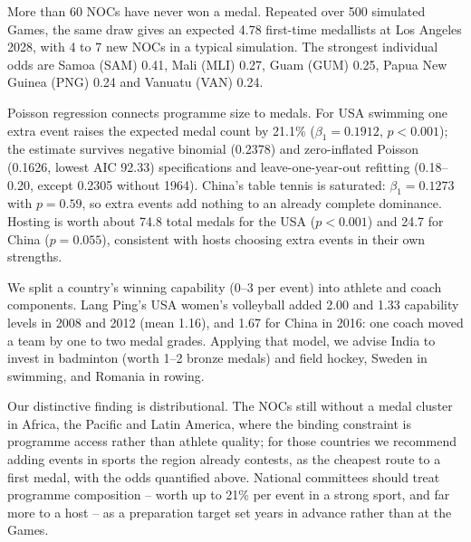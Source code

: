 \documentclass[12pt]{article}
\begin{document}
More than 60 NOCs have never won a medal. Repeated over 500 simulated Games, the same draw gives
an expected 4.78 first-time medallists at Los Angeles 2028, with 4 to 7 new NOCs in a typical
simulation. The strongest individual odds are Samoa (SAM) 0.41, Mali (MLI) 0.27, Guam (GUM) 0.25,
Papua New Guinea (PNG) 0.24 and Vanuatu (VAN) 0.24.

Poisson regression connects programme size to medals. For USA swimming one extra event raises the
expected medal count by 21.1\% ($\beta_1 = 0.1912$, $p < 0.001$); the estimate survives negative
binomial (0.2378) and zero-inflated Poisson (0.1626, lowest AIC 92.33) specifications and
leave-one-year-out refitting (0.18--0.20, except 0.2305 without 1964). China's table tennis is
saturated: $\beta_1 = 0.1273$ with $p = 0.59$, so extra events add nothing to an already complete
dominance. Hosting is worth about 74.8 total medals for the USA ($p < 0.001$) and 24.7 for China
($p = 0.055$), consistent with hosts choosing extra events in their own strengths.

We split a country's winning capability ($0$--$3$ per event) into athlete and coach components.
Lang Ping's USA women's volleyball added 2.00 and 1.33 capability levels in 2008 and 2012 (mean
1.16), and 1.67 for China in 2016: one coach moved a team by one to two medal grades. Applying
that model, we advise India to invest in badminton (worth 1--2 bronze medals) and field hockey,
Sweden in swimming, and Romania in rowing.

Our distinctive finding is distributional. The NOCs still without a medal cluster in Africa, the
Pacific and Latin America, where the binding constraint is programme access rather than athlete
quality; for those countries we recommend adding events in sports the region already contests, as
the cheapest route to a first medal, with the odds quantified above. National committees should
treat programme composition -- worth up to 21\% per event in a strong sport, and far more to a
host -- as a preparation target set years in advance rather than at the Games.

\end{document}
